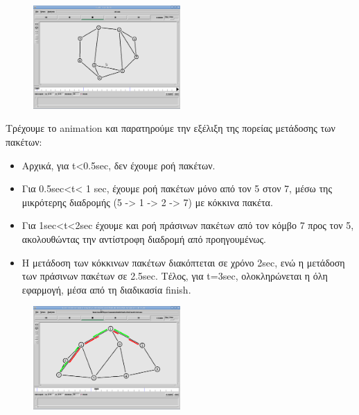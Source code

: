 \documentclass[a4paper,9pt]{article}
\begin{document}
\def\thesection {\Roman{section}.}



\section{}

\begin{figure}[h]
    \centering
    \includegraphics[width=0.5\textwidth]{files/1.png}
\end{figure}

Τρέχουμε το animation και παρατηρούμε την εξέλιξη της πορείας μετάδοσης των
πακέτων:

\begin{itemize}
    \item Αρχικά, για t<0.5sec, δεν έχουμε ροή πακέτων.
    \item Για 0.5sec<t< 1 sec, έχουμε ροή πακέτων μόνο από τον 5 στον 7, μέσω
        της μικρότερης διαδρομής (5 -> 1 -> 2 -> 7) με κόκκινα πακέτα.
    \item Για 1sec<t<2sec έχουμε και ροή πράσινων πακέτων από τον κόμβο 7 προς τον
        5, ακολουθώντας την αντίστροφη διαδρομή από προηγουμένως.
    \item Η μετάδοση των κόκκινων πακέτων διακόπτεται σε χρόνο 2sec, ενώ η
        μετάδοση των πράσινων πακέτων σε 2.5sec. Τέλος, για t=3sec, ολοκληρώνεται η
        όλη εφαρμογή, μέσα από τη διαδικασία finish.
\end{itemize}

\begin{figure}[h]
    \centering
    \includegraphics[width=0.5\textwidth]{files/2.png}
\end{figure}
\end{document}

